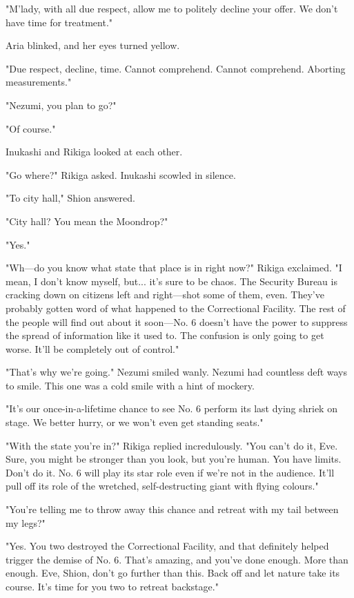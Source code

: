 "M'lady, with all due respect, allow me to politely decline your offer.
We don't have time for treatment."

Aria blinked, and her eyes turned yellow.

{\sffamily "Due respect, decline, time. Cannot comprehend. Cannot comprehend.
Aborting measurements."}

"Nezumi, you plan to go?"

"Of course."

Inukashi and Rikiga looked at each other.

"Go where?" Rikiga asked. Inukashi scowled in silence.

"To city hall," Shion answered.

"City hall? You mean the Moondrop?"

"Yes."

"Wh---do you know what state that place is in right now?" Rikiga
exclaimed. "I mean, I don't know myself, but... it's sure to be chaos.
The Security Bureau is cracking down on citizens left and right---shot
some of them, even. They've probably gotten word of what happened to the
Correctional Facility. The rest of the people will find out about it
soon---No. 6 doesn't have the power to suppress the spread of information
like it used to. The confusion is only going to get worse. It'll be
completely out of control."

"That's why we're going." Nezumi smiled wanly. Nezumi had countless deft
ways to smile. This one was a cold smile with a hint of mockery.

"It's our once-in-a-lifetime chance to see No. 6 perform its last dying
shriek on stage. We better hurry, or we won't even get standing seats."

"With the state you're in?" Rikiga replied incredulously. "You can't do
it, Eve. Sure, you might be stronger than you look, but you're human.
You have limits. Don't do it. No. 6 will play its star role even if
we're not in the audience. It'll pull off its role of the wretched,
self-destructing giant with flying colours."

"You're telling me to throw away this chance and retreat with my tail
between my legs?"

"Yes. You two destroyed the Correctional Facility, and that definitely
helped trigger the demise of No. 6. That's amazing, and you've done
enough. More than enough. Eve, Shion, don't go further than this. Back
off and let nature take its course. It's time for you two to retreat
backstage."


